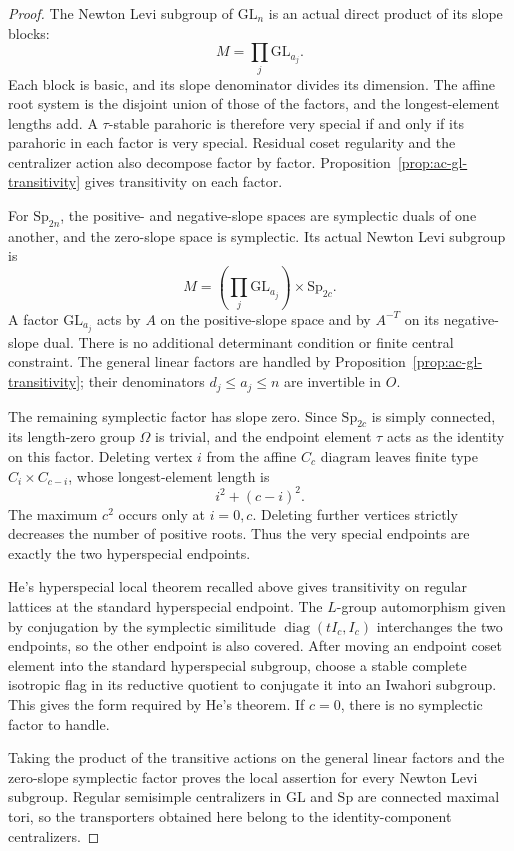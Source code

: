\documentclass[11pt,a4paper]{article}
\theoremstyle{definition}
\theoremstyle{remark}
\begin{document}
\begin{proof}
The Newton Levi subgroup of \(\mathrm{GL}_n\) is an actual direct product
of its slope blocks:
\[
M=\prod_j\mathrm{GL}_{a_j}.
\]
Each block is basic, and its slope denominator divides its dimension.
The affine root system is the disjoint union of those of the factors,
and the longest-element lengths add. A \(\tau\)-stable parahoric is
therefore very special if and only if its parahoric in each factor is
very special. Residual coset regularity and the centralizer action also
decompose factor by factor. Proposition~\ref{prop:ac-gl-transitivity}
gives transitivity on each factor.

For \(\mathrm{Sp}_{2n}\), the positive- and negative-slope spaces are
symplectic duals of one another, and the zero-slope space is symplectic.
Its actual Newton Levi subgroup is
\[
M=\left(\prod_j\mathrm{GL}_{a_j}\right)\times\mathrm{Sp}_{2c}.
\]
A factor \(\mathrm{GL}_{a_j}\) acts by \(A\) on the positive-slope space
and by \(A^{-T}\) on its negative-slope dual. There is no additional
determinant condition or finite central constraint. The general linear
factors are handled by Proposition~\ref{prop:ac-gl-transitivity}; their
denominators \(d_j\leq a_j\leq n\) are invertible in \(O\).

The remaining symplectic factor has slope zero. Since
\(\mathrm{Sp}_{2c}\) is simply connected, its length-zero group
\(\Omega\) is trivial, and the endpoint element \(\tau\) acts as the
identity on this factor. Deleting vertex \(i\) from the affine \(C_c\)
diagram leaves finite type \(C_i\times C_{c-i}\), whose longest-element
length is
\[
i^2+(c-i)^2.
\]
The maximum \(c^2\) occurs only at \(i=0,c\). Deleting further vertices
strictly decreases the number of positive roots. Thus the very special
endpoints are exactly the two hyperspecial endpoints.

He's hyperspecial local theorem recalled above gives transitivity on
regular lattices at the standard hyperspecial endpoint. The
\(L\)-group automorphism given by conjugation by the symplectic
similitude \(\operatorname{diag}(tI_c,I_c)\) interchanges the two
endpoints, so the other endpoint is also covered. After moving an
endpoint coset element into the standard hyperspecial subgroup, choose
a stable complete isotropic flag in its reductive quotient to conjugate
it into an Iwahori subgroup. This gives the form required by He's
theorem. If \(c=0\), there is no symplectic factor to handle.

Taking the product of the transitive actions on the general linear
factors and the zero-slope symplectic factor proves the local assertion
for every Newton Levi subgroup. Regular semisimple centralizers in
\(\mathrm{GL}\) and \(\mathrm{Sp}\) are connected maximal tori, so the
transporters obtained here belong to the identity-component
centralizers.
\end{proof}
\end{document}
